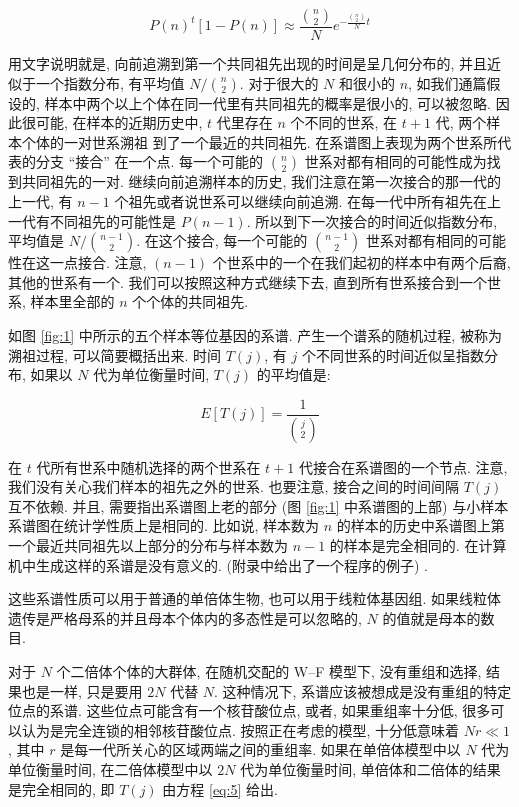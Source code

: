 \documentclass[12pt]{article}
\begin{document}
\begin{equation} \label{eq:4}
    P(n)^{t}[1-P(n)] \approx \frac{\binom{n}{2}}{N} e^{-\frac{\binom{n}{2}}{N}t}
\end{equation}

用文字说明就是, 向前追溯到第一个共同祖先出现的时间是呈几何分布的, 并且近似于一个指数分布, 有平均值
$N/\binom{n}{2}$. 对于很大的 $N$ 和很小的 $n$, 如我们通篇假设的,
样本中两个以上个体在同一代里有共同祖先的概率是很小的, 可以被忽略. 因此很可能, 在样本的近期历史中, $t$
代里存在 $n$ 个不同的世系, 在 $t+1$ 代, 两个样本个体的一对世系溯祖 到了一个最近的共同祖先.
在系谱图上表现为两个世系所代表的分支 ``接合'' 在一个点. 每一个可能的 $\binom{n}{2}$
世系对都有相同的可能性成为找到共同祖先的一对. 继续向前追溯样本的历史, 我们注意在第一次接合的那一代的上一代, 有
$n-1$ 个祖先或者说世系可以继续向前追溯. 在每一代中所有祖先在上一代有不同祖先的可能性是 $P(n-1)$.
所以到下一次接合的时间近似指数分布, 平均值是 $N/\binom{n-1}{2}$. 在这个接合, 每一个可能的
$\binom{n-1}{2}$ 世系对都有相同的可能性在这一点接合. 注意, $(n-1)$
个世系中的一个在我们起初的样本中有两个后裔, 其他的世系有一个. 我们可以按照这种方式继续下去,
直到所有世系接合到一个世系, 样本里全部的 $n$ 个个体的共同祖先.

如图 \ref{fig:1} 中所示的五个样本等位基因的系谱. 产生一个谱系的随机过程, 被称为溯祖过程,
可以简要概括出来. 时间 $T(j)$, 有 $j$ 个不同世系的时间近似呈指数分布, 如果以 $N$
代为单位衡量时间, $T(j)$ 的平均值是:

\begin{equation} \label{eq:5}
    E[T(j)]=\frac{1}{\binom{j}{2}}
\end{equation}

在 $t$ 代所有世系中随机选择的两个世系在 $t+1$ 代接合在系谱图的一个节点. 注意, 我们没有关心我们样本的祖先之外的世系.
也要注意, 接合之间的时间间隔 $T(j)$ 互不依赖. 并且, 需要指出系谱图上老的部分 (图 \ref{fig:1} 中系谱图的上部)
与小样本系谱图在统计学性质上是相同的. 比如说, 样本数为 $n$
的样本的历史中系谱图上第一个最近共同祖先以上部分的分布与样本数为 $n-1$ 的样本是完全相同的.
在计算机中生成这样的系谱是没有意义的. (附录中给出了一个程序的例子) .

这些系谱性质可以用于普通的单倍体生物, 也可以用于线粒体基因组. 如果线粒体遗传是严格母系的并且母本个体内的多态性是可以忽略的,
$N$ 的值就是母本的数目.

对于 $N$ 个二倍体个体的大群体, 在随机交配的 W--F 模型下, 没有重组和选择, 结果也是一样, 只是要用 $2N$ 代替 $N$.
这种情况下, 系谱应该被想成是没有重组的特定位点的系谱. 这些位点可能含有一个核苷酸位点, 或者, 如果重组率十分低,
很多可以认为是完全连锁的相邻核苷酸位点. 按照正在考虑的模型, 十分低意味着 $Nr\ll 1$, 其中 $r$
是每一代所关心的区域两端之间的重组率. 如果在单倍体模型中以 $N$ 代为单位衡量时间, 在二倍体模型中以 $2N$ 代为单位衡量时间,
单倍体和二倍体的结果是完全相同的, 即 $T(j)$ 由方程 \ref{eq:5} 给出.
\end{document}
